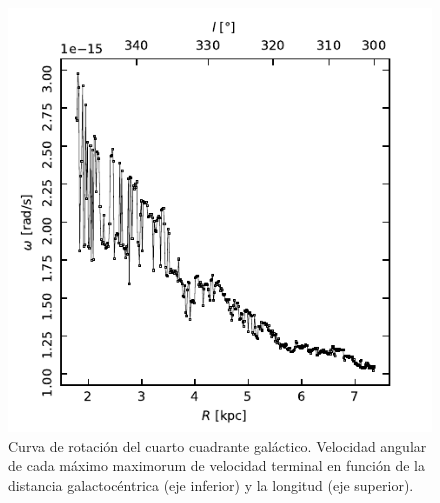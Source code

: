 \begin{figure}[htbp]
	\includegraphics{rsc/w.pdf}
	\caption{Curva de rotación del cuarto cuadrante galáctico. Velocidad angular de cada máximo maximorum de velocidad terminal en función de la distancia galactocéntrica (eje inferior) y la longitud (eje superior).}
	\label{fig:w}
\end{figure}
